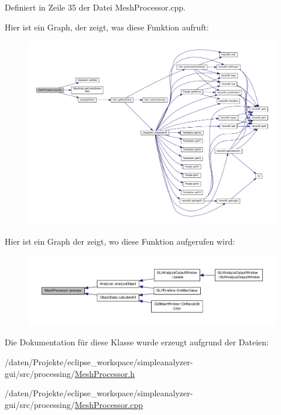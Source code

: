 Definiert in Zeile 35 der Datei Mesh\-Processor.\-cpp.



Hier ist ein Graph, der zeigt, was diese Funktion aufruft\-:\nopagebreak
\begin{figure}[H]
\begin{center}
\leavevmode
\includegraphics[width=350pt]{classMeshProcessor_a060c3815db33f8e52ac620ed2239ccc9_cgraph}
\end{center}
\end{figure}




Hier ist ein Graph der zeigt, wo diese Funktion aufgerufen wird\-:\nopagebreak
\begin{figure}[H]
\begin{center}
\leavevmode
\includegraphics[width=350pt]{classMeshProcessor_a060c3815db33f8e52ac620ed2239ccc9_icgraph}
\end{center}
\end{figure}




Die Dokumentation für diese Klasse wurde erzeugt aufgrund der Dateien\-:\begin{DoxyCompactItemize}
\item 
/daten/\-Projekte/eclipse\-\_\-workspace/simpleanalyzer-\/gui/src/processing/\hyperlink{MeshProcessor_8h}{Mesh\-Processor.\-h}\item 
/daten/\-Projekte/eclipse\-\_\-workspace/simpleanalyzer-\/gui/src/processing/\hyperlink{MeshProcessor_8cpp}{Mesh\-Processor.\-cpp}\end{DoxyCompactItemize}
